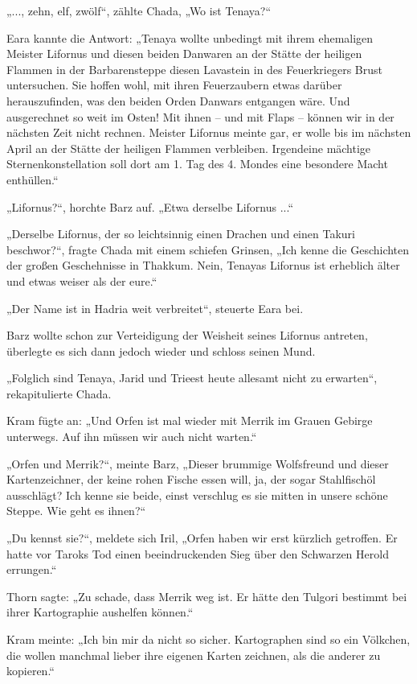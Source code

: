 „..., zehn, elf, zwölf“, zählte Chada, „Wo ist Tenaya?“

Eara kannte die Antwort: „Tenaya wollte unbedingt mit ihrem ehemaligen Meister Lifornus und diesen beiden Danwaren an der Stätte der heiligen Flammen in der Barbarensteppe diesen Lavastein in des Feuerkriegers Brust untersuchen. Sie hoffen wohl, mit ihren Feuerzaubern etwas darüber herauszufinden, was den beiden Orden Danwars entgangen wäre. Und ausgerechnet so weit im Osten! Mit ihnen – und mit Flaps – können wir in der nächsten Zeit nicht rechnen. Meister Lifornus meinte gar, er wolle bis im nächsten April an der Stätte der heiligen Flammen verbleiben. Irgendeine mächtige Sternenkonstellation soll dort am 1. Tag des 4. Mondes eine besondere Macht enthüllen.“

„Lifornus?“, horchte Barz auf. „Etwa derselbe Lifornus ...“

„Derselbe Lifornus, der so leichtsinnig einen Drachen und einen Takuri beschwor?“, fragte Chada mit einem schiefen Grinsen, „Ich kenne die Geschichten der großen Geschehnisse in Thakkum. Nein, Tenayas Lifornus ist erheblich älter und etwas weiser als der eure.“

„Der Name ist in Hadria weit verbreitet“, steuerte Eara bei.

Barz wollte schon zur Verteidigung der Weisheit seines Lifornus antreten, überlegte es sich dann jedoch wieder und schloss seinen Mund.

„Folglich sind Tenaya, Jarid und Trieest heute allesamt nicht zu erwarten“, rekapitulierte Chada.

Kram fügte an: „Und Orfen ist mal wieder mit Merrik im Grauen Gebirge unterwegs. Auf ihn müssen wir auch nicht warten.“

„Orfen und Merrik?“, meinte Barz, „Dieser brummige Wolfsfreund und dieser Kartenzeichner, der keine rohen Fische essen will, ja, der sogar Stahlfischöl ausschlägt? Ich kenne sie beide, einst verschlug es sie mitten in unsere schöne Steppe. Wie geht es ihnen?“

„Du kennst sie?“, meldete sich Iril, „Orfen haben wir erst kürzlich getroffen. Er hatte vor Taroks Tod einen beeindruckenden Sieg über den Schwarzen Herold errungen.“

Thorn sagte: „Zu schade, dass Merrik weg ist. Er hätte den Tulgori bestimmt bei ihrer Kartographie aushelfen können.“

Kram meinte: „Ich bin mir da nicht so sicher. Kartographen sind so ein Völkchen, die wollen manchmal lieber ihre eigenen Karten zeichnen, als die anderer zu kopieren.“

